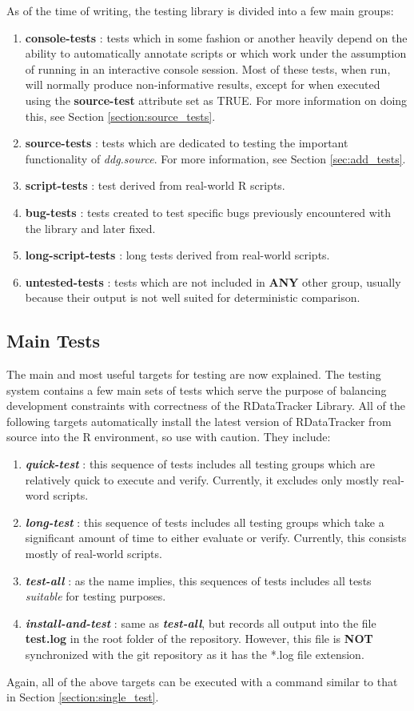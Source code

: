 \documentclass[12pt]{article}
\begin{document}
As of the time of writing, the testing library is divided into a few main groups:
\begin{enumerate}
\item \textbf{console-tests} : tests which in some fashion or another heavily depend on the ability to automatically annotate scripts or which work under the assumption of running in an interactive console session. Most of these tests, when run, will normally produce non-informative results, except for when executed using the \textbf{source-test} attribute set as TRUE. For more information on doing this, see Section \ref{section:source_tests}.
\item \textbf{source-tests} : tests which are dedicated to testing the important functionality of \textit{ddg.source}. For more information, see Section \ref{sec:add_tests}.
\item \textbf{script-tests} : test derived from real-world R scripts.
\item \textbf{bug-tests} : tests created to test specific bugs previously encountered with the library and later fixed.
\item \textbf{long-script-tests} : long tests derived from real-world scripts.
\item \textbf{untested-tests} : tests which are not included in \textbf{ANY} other group, usually because their output is not well suited for deterministic comparison.
\end{enumerate}

\subsection{Main Tests}
The main and most useful targets for testing are now explained. The testing system contains a few main sets of tests which serve the purpose of balancing development constraints with correctness of the RDataTracker Library. All of the following targets automatically install the latest version of RDataTracker from source into the R environment, so use with caution. They include:
\begin{enumerate}
\item \textbf{\textit{quick-test}} : this sequence of tests includes all testing groups which are relatively quick to execute and verify. Currently, it excludes only mostly real-word scripts.
\item \textbf{\textit{long-test}} : this sequence of tests includes all testing groups which take a significant amount of time to either evaluate or verify. Currently, this consists mostly of real-world scripts.
\item \textbf{\textit{test-all}} : as the name implies, this sequences of tests includes all tests \textit{suitable} for testing purposes.
\item \textbf{\textit{install-and-test}} : same as \textbf{\textit{test-all}}, but records all output into the file \textbf{test.log} in the root folder of the repository. However, this file is \textbf{NOT} synchronized with the git repository as it has the *.log file extension.
\end{enumerate} 
Again, all of the above targets can be executed with a command similar to that in Section \ref{section:single_test}.
\end{document}
